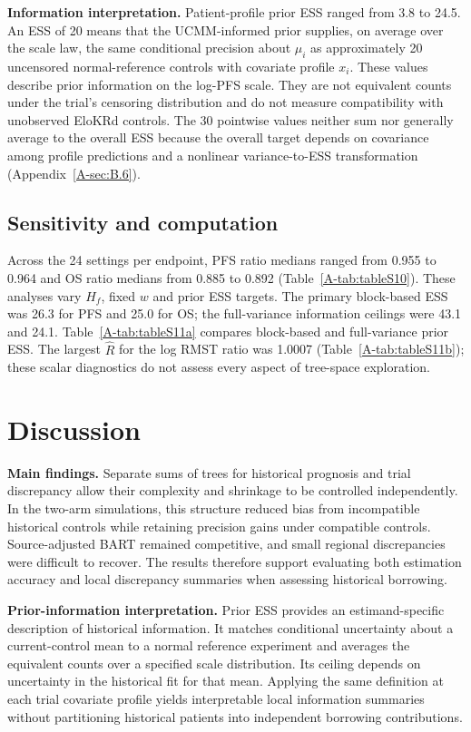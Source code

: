 \documentclass[11pt]{article}
\begin{document}
\noindent\textbf{Information interpretation.}
Patient-profile prior ESS ranged from 3.8 to 24.5. An ESS of 20 means that the UCMM-informed prior supplies, on average over the scale law, the same conditional precision about $\mu_i$ as approximately 20 uncensored normal-reference controls with covariate profile $x_i$. These values describe prior information on the log-PFS scale. They are not equivalent counts under the trial's censoring distribution and do not measure compatibility with unobserved EloKRd controls. The 30 pointwise values neither sum nor generally average to the overall ESS because the overall target depends on covariance among profile predictions and a nonlinear variance-to-ESS transformation (Appendix~\ref{A-sec:B.6}).

\subsection{Sensitivity and computation}
Across the 24 \lrc{} settings per endpoint, PFS ratio medians ranged from 0.955 to 0.964 and OS ratio medians from 0.885 to 0.892 (Table~\ref{A-tab:tableS10}). These analyses vary $H_f$, fixed $w$ and prior ESS targets. The primary block-based ESS was 26.3 for PFS and 25.0 for OS; the full-variance information ceilings were 43.1 and 24.1. Table~\ref{A-tab:tableS11a} compares block-based and full-variance prior ESS. The largest $\widehat R$ for the log RMST ratio was 1.0007 (Table~\ref{A-tab:tableS11b}); these scalar diagnostics do not assess every aspect of tree-space exploration.

\section{Discussion}
\noindent\textbf{Main findings.}
Separate sums of trees for historical prognosis and trial discrepancy allow their complexity and shrinkage to be controlled independently. In the two-arm simulations, this structure reduced bias from incompatible historical controls while retaining precision gains under compatible controls. Source-adjusted BART remained competitive, and small regional discrepancies were difficult to recover. The results therefore support evaluating both estimation accuracy and local discrepancy summaries when assessing historical borrowing.

\noindent\textbf{Prior-information interpretation.}
Prior ESS provides an estimand-specific description of historical information. It matches conditional uncertainty about a current-control mean to a normal reference experiment and averages the equivalent counts over a specified scale distribution. Its ceiling depends on uncertainty in the historical fit for that mean. Applying the same definition at each trial covariate profile yields interpretable local information summaries without partitioning historical patients into independent borrowing contributions.
\end{document}

